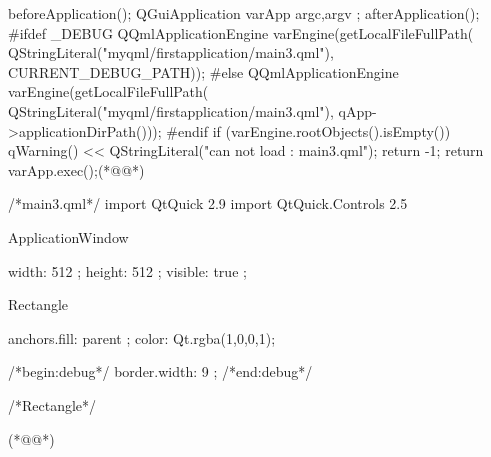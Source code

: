\FloatBarrier
\begin{thebookfilesourceone}[escapeinside={(*@}{@*)},
label=f000022,
caption=GoodLuck,
title=\lstlistingname \thelstlisting
,firstnumber=111]
beforeApplication();
QGuiApplication varApp{ argc,argv };
afterApplication();
#ifdef _DEBUG
QQmlApplicationEngine varEngine(getLocalFileFullPath(
    QStringLiteral("myqml/firstapplication/main3.qml"),
    CURRENT_DEBUG_PATH));
#else
QQmlApplicationEngine varEngine(getLocalFileFullPath(
    QStringLiteral("myqml/firstapplication/main3.qml"),
    qApp->applicationDirPath()));
#endif
if (varEngine.rootObjects().isEmpty()) {
    qWarning() << QStringLiteral("can not load : main3.qml");
    return -1;
}
return varApp.exec();(*@\marginpar[\hfill\setlength\fboxsep{2pt}\fbox{\footnotesize{\kaishu\parbox{1em}{\setlength{\baselineskip}{2pt}\lstlistingname}}\footnotesize{\thelstlisting}}]{\setlength\fboxsep{2pt}\fbox{\footnotesize{\kaishu\parbox{1em}{\setlength{\baselineskip}{2pt}\lstlistingname}}\footnotesize{\thelstlisting}}}@*)\end{thebookfilesourceone}          %
\FloatBarrier
\begin{thebookfilesourceone}[escapeinside={(*@}{@*)},
label=f000025,
caption=GoodLuck,
title=\lstlistingname \thelstlisting
]
/*main3.qml*/
import QtQuick 2.9
import QtQuick.Controls 2.5

ApplicationWindow {

    width: 512 ;
    height: 512 ;
    visible: true ;

    Rectangle{
        anchors.fill: parent ;
        color: Qt.rgba(1,0,0,1);

        /*begin:debug*/
        border.width: 9 ;
        /*end:debug*/

    }/*Rectangle*/

}(*@\marginpar[\hfill\setlength\fboxsep{2pt}\fbox{\footnotesize{\kaishu\parbox{1em}{\setlength{\baselineskip}{2pt}\lstlistingname}}\footnotesize{\thelstlisting}}]{\setlength\fboxsep{2pt}\fbox{\footnotesize{\kaishu\parbox{1em}{\setlength{\baselineskip}{2pt}\lstlistingname}}\footnotesize{\thelstlisting}}}@*)\end{thebookfilesourceone}          %



































